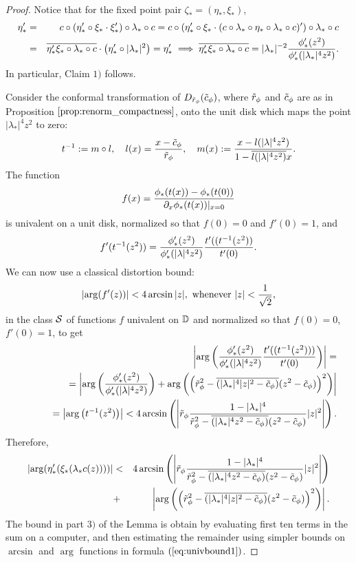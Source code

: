 \begin{proof}

Notice that for the fixed point pair $\zeta_*=(\eta_*,\xi_*)$,
\begin{eqnarray}
\nonumber \eta_*' &=& c \circ \left( \eta'_* \circ \xi_* \cdot \xi_*'\right) \circ \lambda_* \circ c= c \circ \left( \eta'_* \circ \xi_* \cdot (c \circ \lambda_* \circ \eta_* \circ \lambda_* \circ c)'  \right) \circ \lambda_* \circ c\\
\label{eq:univbound} &=&\overline{\eta_*' \xi_* \circ \lambda_* \circ c} \cdot \left(\eta_*' \circ |\lambda_*|^2 \right)=\eta_*'  \implies  \overline{\eta_*' \xi_* \circ \lambda_* \circ c} = |\lambda_*|^{-2} { \phi_*'(z^2) \over \phi'_*(|\lambda_*|^4 z^2)}.
\end{eqnarray}
In particular, Claim $1)$ follows.
 
Consider the conformal transformation of $D_{\tr_\phi}(\tc_\phi)$, where $\tr_\phi$ and $\tc_\phi$ are as in Proposition $\ref{prop:renorm_compactness}$, onto the unit disk which maps the point $|\lambda_*|^4 z^2$ to zero:
$$ t^{-1}:=m \circ l, \quad l(x)={x  - \tc_\phi \over \tr_\phi}, \quad m(x):={x-l(|\lambda|^4 z^2) \over 1 - \overline{l(|\lambda|^4 z^2)} x}.$$
The function 
$$f(x)={ \phi_*(t(x)) -\phi_*(t(0))  \over \partial_x \phi_*(t(x))\arrowvert_{x=0} }$$
is univalent on a unit disk, normalized so that $f(0)=0$ and $f'(0)=1$, and
$$f'(t^{-1}(z^2))= { \phi_*'(z^2)   \over  \phi_*'(|\lambda|^4 z^2)  } {t'( (t^{-1}(z^2) ) \over t'(0)}.$$
We can now use  a classical distortion bound:
$$|\arg(f'(z))|<4 \arcsin{|z|},\ { \rm whenever} \ |z| <{1 \over \sqrt{2}},$$
in the class $\cS$ of functions $f$ univalent on $\fD$ and normalized so that $f(0)=0$, $f'(0)=1$, to get
\begin{eqnarray}
\nonumber && \left| \arg \left( { \phi_*'(z^2)   \over  \phi_*'(|\lambda|^4 z^2)  } {t'( (t^{-1}(z^2) )) \over t'(0) } \right) \right| = \\
\nonumber &&\phantom{aaaa}= \left| \arg \left( { \phi_*'(z^2)   \over  \phi_*'(|\lambda|^4 z^2)  } \right) +  \arg \left( \left( \tr_\phi^2-\overline{(|\lambda_*|^4 |z|^2 -\tc_\phi)}  (z^2-\tc_\phi) \right)^2 \right) \right| \\
\nonumber  &&\phantom{aaaa}= \left|\arg \left(t^{-1} (z^2) \right) \right| < 4 \arcsin\left( \left|\tr_\phi {1-|\lambda_*|^4 \over \tr^2_\phi-\overline{( |\lambda_*|^4 z^2-\tc_\phi  )}(z^2-\tc_\phi) }  |z|^2  \right|  \right).
\end{eqnarray}
Therefore,
\begin{eqnarray}
\nonumber | \arg{ \left( \eta_*'(\xi_*(\lambda_* c(z))) \right) }| &<&  4 \arcsin\left( \left|\tr_\phi{1-|\lambda_*|^4 \over \tr^2_\phi-\overline{( |\lambda_*|^4 z^2-\tc_\phi  )}(z^2-\tc_\phi) }  |z|^2  \right|  \right) \\
\label{eq:univbound1} &+& \left| \arg \left( \left( \tr_\phi^2-\overline{(|\lambda_*|^4 |z|^2 -\tc_\phi)}  (z^2-\tc_\phi) \right)^2 \right) \right|.
\end{eqnarray}
The bound in part $3)$ of the Lemma is obtain by evaluating first ten terms in the sum on a computer, and then estimating the remainder using simpler bounds on $\arcsin$ and $\arg$ functions in formula $(\ref{eq:univbound1})$. 
  

\end{proof}
